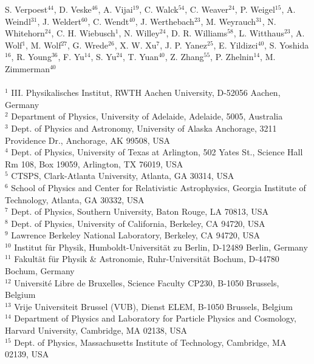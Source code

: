 S. Verpoest$^{44}$,
D. Veske$^{46}$,
A. Vijai$^{19}$,
C. Walck$^{54}$,
C. Weaver$^{24}$,
P. Weigel$^{15}$,
A. Weindl$^{31}$,
J. Weldert$^{60}$,
C. Wendt$^{40}$,
J. Werthebach$^{23}$,
M. Weyrauch$^{31}$,
N. Whitehorn$^{24}$,
C. H. Wiebusch$^{1}$,
N. Willey$^{24}$,
D. R. Williams$^{58}$,
L. Witthaus$^{23}$,
A. Wolf$^{1}$,
M. Wolf$^{27}$,
G. Wrede$^{26}$,
X. W. Xu$^{7}$,
J. P. Yanez$^{25}$,
E. Yildizci$^{40}$,
S. Yoshida$^{16}$,
R. Young$^{36}$,
F. Yu$^{14}$,
S. Yu$^{24}$,
T. Yuan$^{40}$,
Z. Zhang$^{55}$,
P. Zhelnin$^{14}$,
M. Zimmerman$^{40}$\\
\\
$^{1}$ III. Physikalisches Institut, RWTH Aachen University, D-52056 Aachen, Germany \\
$^{2}$ Department of Physics, University of Adelaide, Adelaide, 5005, Australia \\
$^{3}$ Dept. of Physics and Astronomy, University of Alaska Anchorage, 3211 Providence Dr., Anchorage, AK 99508, USA \\
$^{4}$ Dept. of Physics, University of Texas at Arlington, 502 Yates St., Science Hall Rm 108, Box 19059, Arlington, TX 76019, USA \\
$^{5}$ CTSPS, Clark-Atlanta University, Atlanta, GA 30314, USA \\
$^{6}$ School of Physics and Center for Relativistic Astrophysics, Georgia Institute of Technology, Atlanta, GA 30332, USA \\
$^{7}$ Dept. of Physics, Southern University, Baton Rouge, LA 70813, USA \\
$^{8}$ Dept. of Physics, University of California, Berkeley, CA 94720, USA \\
$^{9}$ Lawrence Berkeley National Laboratory, Berkeley, CA 94720, USA \\
$^{10}$ Institut f{\"u}r Physik, Humboldt-Universit{\"a}t zu Berlin, D-12489 Berlin, Germany \\
$^{11}$ Fakult{\"a}t f{\"u}r Physik {\&} Astronomie, Ruhr-Universit{\"a}t Bochum, D-44780 Bochum, Germany \\
$^{12}$ Universit{\'e} Libre de Bruxelles, Science Faculty CP230, B-1050 Brussels, Belgium \\
$^{13}$ Vrije Universiteit Brussel (VUB), Dienst ELEM, B-1050 Brussels, Belgium \\
$^{14}$ Department of Physics and Laboratory for Particle Physics and Cosmology, Harvard University, Cambridge, MA 02138, USA \\
$^{15}$ Dept. of Physics, Massachusetts Institute of Technology, Cambridge, MA 02139, USA \\
